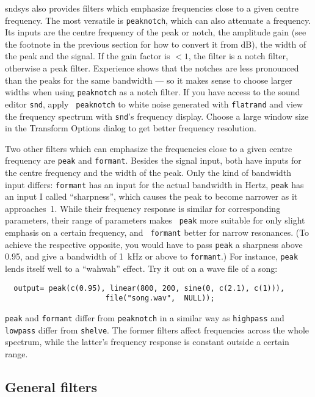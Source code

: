\documentclass{article}
\def\s{{\sc sndsys} }
\def\bv{\begin{verbatim}}
\begin{document}
\s also provides filters which emphasize frequencies close to a given centre
frequency.  The most versatile is {\tt peaknotch}, which can also attenuate a
frequency.  Its inputs are the centre frequency of the peak or notch, the
amplitude gain (see the footnote in the previous section for how to convert it
from dB), the width of the peak and the signal.  If the gain factor is ${}<1$,
the filter is a notch filter, otherwise a peak filter.  Experience shows that
the notches are less pronounced than the peaks for the same bandwidth --- so it
makes sense to choose larger widths when using {\tt peaknotch} as a notch
filter.  If you have access to the sound editor {\tt snd}, apply {\tt
peaknotch} to white noise generated with {\tt flatrand} and view the frequency
spectrum with {\tt snd}'s frequency display.  Choose a large window size in the
Transform Options dialog to get better frequency resolution.

Two other filters which can emphasize the frequencies close to a given centre
frequency are {\tt peak} and {\tt formant}.  Besides the signal input, both
have inputs for the centre frequency and the width of the peak.  Only the kind
of bandwidth input differs: {\tt formant} has an input for the actual bandwidth
in Hertz, {\tt peak} has an input I called ``sharpness'', which causes the peak
to become narrower as it approaches~1.  While their frequency response is
similar for corresponding parameters, their range of parameters makes {\tt
peak} more suitable for only slight emphasis on a certain frequency, and {\tt
formant} better for narrow resonances.  (To achieve the respective opposite,
you would have to pass {\tt peak} a sharpness above 0.95, and give a bandwidth
of 1~kHz or above to {\tt formant}.)  For instance, {\tt peak} lends itself
well to a ``wahwah'' effect.  Try it out on a wave file of a song:

\bv
  output= peak(c(0.95), linear(800, 200, sine(0, c(2.1), c(1))),
                       file("song.wav",  NULL));
\end{verbatim}

{\tt peak} and {\tt formant} differ from {\tt peaknotch} in a similar way as
{\tt highpass} and {\tt lowpass} differ from {\tt shelve}.  The former filters
affect frequencies across the whole spectrum, while the latter's frequency
response is constant outside a certain range.


\subsection{General filters}
\end{document}
